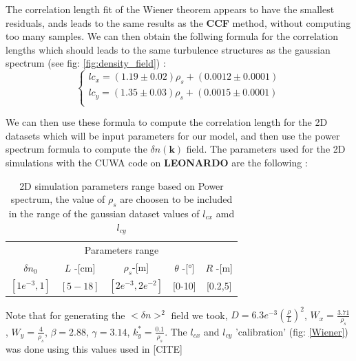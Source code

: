 \documentclass[11pt,a4paper,openany]{report}
\begin{document}
\begin{multicols}{2}

    The correlation length fit of the Wiener theorem appears to have the smallest residuals, ands leads to the same results as the \textbf{CCF} method, without computing too many samples. We can then obtain the follwing formula for the correlation lengths which should leads to the same turbulence structures as the gaussian spectrum (see fig: \ref{fig:density_field}) :
    \begin{equation*}
        \begin{cases}
            lc_x = (1.19 \pm 0.02) \rho_s + (0.0012 \pm 0.0001) \\
            lc_y = (1.35 \pm 0.03) \rho_s + (0.0015 \pm 0.0001) \\
        \end{cases}
        \label{eq:}
    \end{equation*}

    We can then use these formula to compute the correlation length for the 2D datasets which will be input parameters for our model, and then use the power spectrum formula to compute the $\delta n(\textbf{k} )$ field. The parameters used for the 2D simulations with the CUWA code on \textbf{LEONARDO} are the following :
    \setlength{\tabcolsep}{.02\linewidth}

    \begin{table}[H]
        \begin{tabular}{c|c|c|c|c}
            \toprule
            \multicolumn{5}{c}{Parameters range}                                         \\
            \cmidrule{1 -5}
            $\delta n_0$   & $L$ -[cm] & $\rho_s$-[m]         & $\theta$ -[°] & $R$ -[m] \\
            \midrule
            $[1e^{-3}, 1]$ & $[5-18]$  & $[2e^{-3}, 2e^{-2}]$ & [0-10]        & [0.2,5]  \\
            \bottomrule
        \end{tabular}
        \caption{2D simulation parameters range based on Power spectrum, the value of $\rho_s$ are choosen to be included in the range of the gaussian dataset values of $l_{cx}$ amd $l_{cy}$ }
        \label{Power_table}
    \end{table}

    Note that for generating the $<\delta n>^2$ field we took, $D = 6.3e^{-3} (\frac{\rho}{L})^2$, $W_x = \frac{3.71}{\rho_s}$, $W_y = \frac{4}{\rho_s}$, $\beta = 2.88$, $\gamma = 3.14$, $k_y^* = \frac{0.1}{\rho_s}$. The $l_{cx}$ and $l_{cy}$ 'calibration' (fig: \ref{Wiener}) was done using this values used in [CITE]


\end{multicols}
\end{document}
